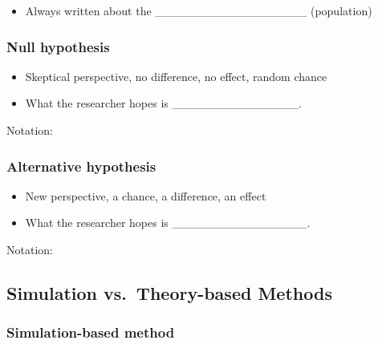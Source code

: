 \documentclass[
]{report}
\providecommand{\tightlist}{%
  \setlength{\itemsep}{0pt}\setlength{\parskip}{0pt}}
\begin{document}
\vspace{1in}

\begin{itemize}
\tightlist
\item
  Always written about the \_\_\_\_\_\_\_\_\_\_\_\_\_\_\_\_\_\_ (population)
\end{itemize}

\hypertarget{null-hypothesis}{%
\subsubsection*{Null hypothesis}\label{null-hypothesis}}

\begin{itemize}
\item
  Skeptical perspective, no difference, no effect, random chance
\item
  What the researcher hopes is \_\_\_\_\_\_\_\_\_\_\_\_\_\_\_.
\end{itemize}

Notation:

\vspace{0.1in}

\hypertarget{alternative-hypothesis}{%
\subsubsection*{Alternative hypothesis}\label{alternative-hypothesis}}

\begin{itemize}
\item
  New perspective, a chance, a difference, an effect
\item
  What the researcher hopes is \_\_\_\_\_\_\_\_\_\_\_\_\_\_\_\_.
\end{itemize}

Notation:

\vspace{0.1in}

\hypertarget{simulation-vs.-theory-based-methods}{%
\subsection*{Simulation vs.~Theory-based Methods}\label{simulation-vs.-theory-based-methods}}

\hypertarget{simulation-based-method}{%
\subsubsection*{Simulation-based method}\label{simulation-based-method}}
\end{document}
